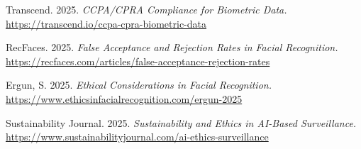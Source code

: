 \begin{thebibliography}{99}
Transcend. 2025. \emph{CCPA/CPRA Compliance for Biometric Data.} \url{https://transcend.io/ccpa-cpra-biometric-data}

RecFaces. 2025. \emph{False Acceptance and Rejection Rates in Facial Recognition.} \url{https://recfaces.com/articles/false-acceptance-rejection-rates}

Ergun, S. 2025. \emph{Ethical Considerations in Facial Recognition.} \url{https://www.ethicsinfacialrecognition.com/ergun-2025}

Sustainability Journal. 2025. \emph{Sustainability and Ethics in AI-Based Surveillance.} \url{https://www.sustainabilityjournal.com/ai-ethics-surveillance}

\end{thebibliography}